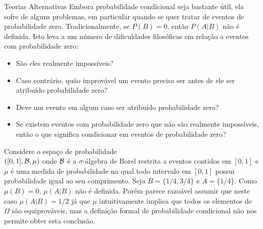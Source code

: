 \begin{frame}{Teorias Alternativas}
	Embora probabilidade condicional seja bastante útil, ela sofre de
	alguns problemas, em particular quando se quer tratar de eventos de
	probabilidade zero. Tradicionalmente, se $P(B)=0$, então $P(A|B)$
	não é definida. Isto leva a um número de dificuldades filosóficas em
	relação a eventos com probabilidade zero:
	\begin{itemize}
		\item São eles realmente
		impossíveis?
		\item Caso contrário, quão improvável um evento precisa ser
		antes de ele ser atribuído probabilidade zero?
		\item Deve um evento em
		algum caso ser atribuído probabilidade zero?
		\item Se existem eventos com
		probabilidade zero que não são realmente impossíveis, então o que
		significa condicionar em eventos de probabilidade zero?
	\end{itemize}

\begin{exem}
Considere o espaço de probabilidade\\ $([0,1],{\cal B},\mu)$ onde ${\cal B}$ é a
	$\sigma$-álgebra de Borel restrita a eventos contidos em $[0,1]$ e
	$\mu$ é uma medida de probabilidade na qual todo intervalo em
	$[0,1]$ possui probabilidade igual ao seu comprimento. Seja
	$B=\{1/4,3/4\}$ e $A=\{1/4\}$. Como $\mu(B)=0$, $\mu(A|B)$ não é
	definida. Porém parece razoável assumir que neste caso $\mu(A|B)=1/2$
	já que $\mu$ intuitivamente implica que todos os elementos de $\Omega$ são
	equiprováveis, mas a definição formal de probabilidade condicional
	não nos permite obter esta conclusão.
\end{exem}

\end{frame}



